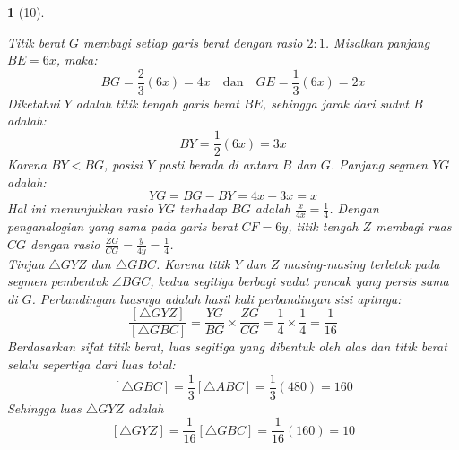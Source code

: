 \documentclass[11pt,a4paper,DIV=12]{scrartcl}
\theoremstyle{problemstyle}
\theoremstyle{answerstyle}
\newtheorem{answer}{}
\begin{document}
\begin{answer}[10]
\begin{center}
  \end{center}
  Titik berat $G$ membagi setiap garis berat dengan rasio $2:1$. Misalkan panjang $BE = 6x$, maka:
  $$ BG = \frac{2}{3}(6x) = 4x \quad \text{dan} \quad GE = \frac{1}{3}(6x) = 2x $$
  Diketahui $Y$ adalah titik tengah garis berat $BE$, sehingga jarak dari sudut $B$ adalah:
  $$ BY = \frac{1}{2}(6x) = 3x $$
  Karena $BY < BG$, posisi $Y$ pasti berada di antara $B$ dan $G$. Panjang segmen $YG$ adalah:
  $$ YG = BG - BY = 4x - 3x = x $$
  Hal ini menunjukkan rasio $YG$ terhadap $BG$ adalah $\frac{x}{4x} = \frac{1}{4}$.
  Dengan penganalogian yang sama pada garis berat $CF = 6y$, titik tengah $Z$ membagi ruas $CG$ dengan rasio $\frac{ZG}{CG} = \frac{y}{4y} = \frac{1}{4}$.\\
  Tinjau $\triangle GYZ$ dan $\triangle GBC$. Karena titik $Y$ dan $Z$ masing-masing terletak pada segmen pembentuk $\angle BGC$, kedua segitiga berbagi sudut puncak yang persis sama di $G$. Perbandingan luasnya adalah hasil kali perbandingan sisi apitnya:
  $$ \frac{[\triangle GYZ]}{[\triangle GBC]} = \frac{YG}{BG} \times \frac{ZG}{CG} = \frac{1}{4} \times \frac{1}{4} = \frac{1}{16} $$
  Berdasarkan sifat titik berat, luas segitiga yang dibentuk oleh alas dan titik berat selalu sepertiga dari luas total:
  $$ [\triangle GBC] = \frac{1}{3} [\triangle ABC] = \frac{1}{3} (480) = 160 $$
  Sehingga luas $\triangle GYZ$ adalah
  $$ [\triangle GYZ] = \frac{1}{16} [\triangle GBC] = \frac{1}{16} (160) = \boxed{10} $$
\end{answer}
\end{document}
